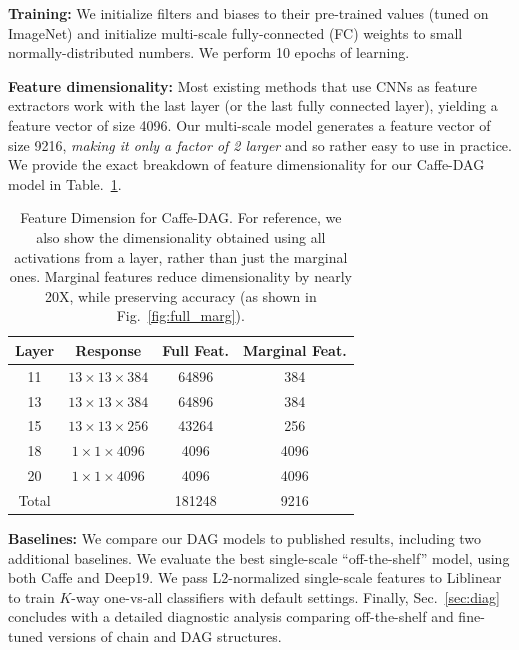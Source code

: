 \documentclass[10pt,twocolumn,letterpaper]{article}
\begin{document}
{\bf Training:} We initialize filters and biases to their pre-trained values (tuned on ImageNet) and initialize multi-scale fully-connected (FC) weights to small normally-distributed numbers. We perform 10 epochs of learning.

{\bf Feature dimensionality:} Most existing methods that use CNNs as feature extractors work with the last layer (or the last fully connected layer), yielding a feature vector of size 4096. Our multi-scale model generates a feature vector of size 9216, {\em making it only a factor of 2 larger} and so rather easy to use in practice. We provide the exact breakdown of feature dimensionality for our Caffe-DAG model in Table.~\ref{table:feat_dim}.
\begin{table}[t!]
\begin{center}
\begin{tabular}{|c|c|c|c|}
\hline
Layer & Response &  Full Feat.& Marginal Feat.\\
\hline
11 & $13\times 13 \times 384$ & 64896 & 384 \\
13 & $13\times 13 \times 384$ & 64896 & 384 \\
15 & $13\times 13 \times 256$ & 43264 & 256 \\
18 & $1\times 1 \times 4096$ & 4096 & 4096 \\
20 & $1\times 1 \times 4096$ & 4096 & 4096 \\
\hline
Total& & 181248 & 9216\\
\hline
\end{tabular}
\end{center}
\caption{Feature Dimension for Caffe-DAG. For reference, we also show the dimensionality obtained using all activations from a layer, rather than just the marginal ones. Marginal features reduce dimensionality by nearly 20X, while preserving accuracy (as shown in Fig.~\ref{fig:full_marg}).}
\label{table:feat_dim}
\end{table}


{\bf Baselines:} We compare our DAG models to published results, including two additional baselines. We evaluate the best single-scale ``off-the-shelf'' model, using both Caffe and Deep19. We pass L2-normalized single-scale features to Liblinear~\cite{liblinear} to train $K$-way one-vs-all classifiers with default settings. Finally, Sec.~\ref{sec:diag} concludes with a detailed diagnostic analysis comparing off-the-shelf and fine-tuned versions of chain and DAG structures.


\end{document}
